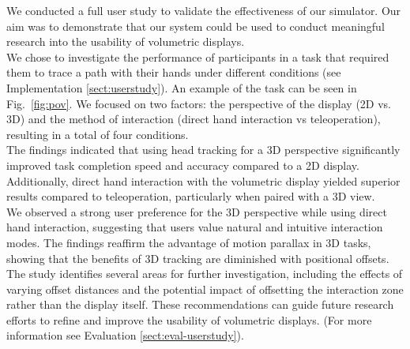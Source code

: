 We conducted a full user study to validate the effectiveness of our simulator. Our aim was to demonstrate that our system could be used to conduct meaningful research into the usability of volumetric displays. \\

We chose to investigate the performance of participants in a task that required them to trace a path with their hands under different conditions (see Implementation \ref{sect:userstudy}). An example of the task can be seen in Fig.~\ref{fig:pov}. We focused on two factors: the perspective of the display (2D vs. 3D) and the method of interaction (direct hand interaction vs teleoperation), resulting in a total of four conditions. \\

The findings indicated that using head tracking for a 3D perspective significantly improved task completion speed and accuracy compared to a 2D display. Additionally, direct hand interaction with the volumetric display yielded superior results compared to teleoperation, particularly when paired with a 3D view. \\

We observed a strong user preference for the 3D perspective while using direct hand interaction, suggesting that users value natural and intuitive interaction modes. The findings reaffirm the advantage of motion parallax in 3D tasks, showing that the benefits of 3D tracking are diminished with positional offsets. \\

The study identifies several areas for further investigation, including the effects of varying offset distances and the potential impact of offsetting the interaction zone rather than the display itself. These recommendations can guide future research efforts to refine and improve the usability of volumetric displays. (For more information see Evaluation \ref{sect:eval-userstudy}).

